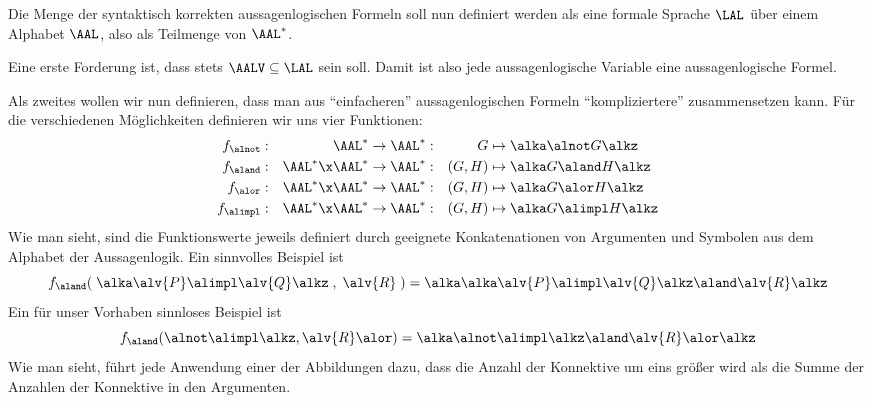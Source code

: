 Die Menge der syntaktisch korrekten aussagenlogischen Formeln soll nun
definiert werden als eine formale Sprache $\LAL$ über einem Alphabet
$\AAL$, also als Teilmenge von $\AAL^*$.
%

Eine erste Forderung ist, dass stets $\AALV\subseteq \LAL$ sein soll.
%
Damit ist also jede aussagenlogische Variable eine aussagenlogische
Formel.

Als zweites wollen wir nun definieren, dass man aus "`einfacheren"'
aussagenlogischen Formeln "`kompliziertere"' zusammensetzen kann.
%
Für die verschiedenen Möglichkeiten definieren wir uns vier Funktionen:
%
\begin{alignat*}{3}
  f_{\alnot}  &:& \AAL^*          & \to \AAL^* :& G      &\mapsto \alka\alnot G\alkz \\
  f_{\aland}  &:& \AAL^*\x \AAL^* & \to \AAL^* :& (G, H) &\mapsto \alka G\aland H\alkz \\
  f_{\alor}   &:& \AAL^*\x \AAL^* & \to \AAL^* :& (G, H) &\mapsto \alka G\alor H\alkz \\
  f_{\alimpl} &:& \AAL^*\x \AAL^* & \to \AAL^* :& (G, H) &\mapsto \alka G\alimpl H\alkz 
\end{alignat*}
%
Wie man sieht, sind die Funktionswerte jeweils definiert durch
geeignete Konkatenationen von Argumenten und Symbolen aus dem Alphabet
der Aussagenlogik.
%
Ein sinnvolles Beispiel ist
\[
  f_{\aland}(\; \alka\alv{P}\alimpl\alv{Q}\alkz\;,\;  \alv{R}\;) = \alka\alka\alv{P}\alimpl\alv{Q}\alkz\aland \alv{R}\alkz
\] 
%
Ein für unser Vorhaben sinnloses Beispiel ist
\[
  f_{\aland}(\alnot\alimpl\alkz,  \alv{R}\alor) = \alka \alnot\alimpl\alkz\aland \alv{R}\alor\alkz
\]
%
Wie man sieht, führt jede Anwendung einer der Abbildungen dazu, dass
die Anzahl der Konnektive um eins größer wird als die Summe der
Anzahlen der Konnektive in den Argumenten.

